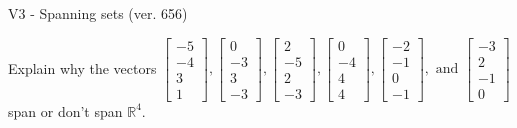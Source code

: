 \begin{exercise}
  \begin{exerciseTitle}V3 - Spanning sets (ver. 656)\end{exerciseTitle}
  \begin{exerciseStatement}
    Explain why the vectors \(\left[\begin{array}{r}
-5 \\
-4 \\
3 \\
1
\end{array}\right] , \left[\begin{array}{r}
0 \\
-3 \\
3 \\
-3
\end{array}\right] , \left[\begin{array}{r}
2 \\
-5 \\
2 \\
-3
\end{array}\right] , \left[\begin{array}{r}
0 \\
-4 \\
4 \\
4
\end{array}\right] , \left[\begin{array}{r}
-2 \\
-1 \\
0 \\
-1
\end{array}\right] , \text{ and } \left[\begin{array}{r}
-3 \\
2 \\
-1 \\
0
\end{array}\right]\) span or don't span \(\mathbb{R}^4\). 
	



\end{exerciseStatement}
\end{exercise}
